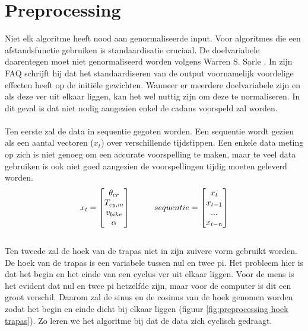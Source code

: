 \section{Preprocessing}
Niet elk algoritme heeft nood aan genormaliseerde input. Voor algoritmes die een afstandsfunctie gebruiken is standaardisatie cruciaal. De doelvariabele daarentegen moet niet genormaliseerd worden volgens Warren S. Sarle \cite{preprocessing faq}. In zijn FAQ schrijft hij dat het standaardiseren van de output voornamelijk voordelige effecten heeft op de initiële gewichten. Wanneer er meerdere doelvariabele zijn en als deze ver uit elkaar liggen, kan het wel nuttig zijn om deze te normaliseren. In dit geval is dat niet nodig aangezien enkel de cadans voorspeld zal worden.
\\\\
\noindent Ten eerste zal de data in sequentie gegoten worden. Een sequentie wordt gezien als een aantal vectoren ($x_t$) over verschillende tijdstippen. Een enkele data meting op zich is niet genoeg om een accurate voorspelling te maken, maar te veel data gebruiken is ook niet goed aangezien de voorspellingen tijdig moeten geleverd worden.
\\
\begin{gather*}
x_t = \begin{bmatrix} 
       \theta _{cr} \\ T_{cy,m} \\ v_{bike} \\ \alpha
     \end{bmatrix} \hspace*{1cm}
sequentie = \begin{bmatrix} 
       x_t \\ x_{t-1} \\ ... \\ x_{t-n}
     \end{bmatrix} 
\end{gather*}
\\
\noindent Ten tweede zal de hoek van de trapas niet in zijn zuivere vorm gebruikt worden. De hoek van de trapas is een variabele tussen nul en twee pi. Het probleem hier is dat het begin en het einde van een cyclus ver uit elkaar liggen. Voor de mens is het evident dat nul en twee pi hetzelfde zijn, maar voor de computer is dit een groot verschil. Daarom zal de sinus en de cosinus van de hoek genomen worden zodat het begin en einde dicht bij elkaar liggen (figuur \ref{fig:preprocessing hoek trapas}). Zo leren we het algoritme bij dat de data zich cyclisch gedraagt.

